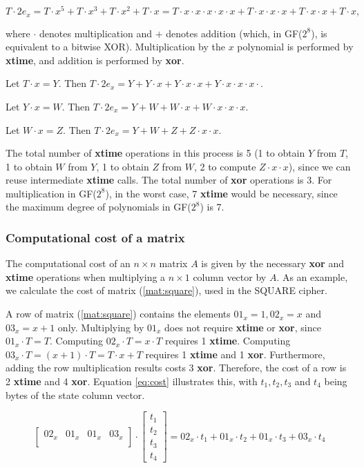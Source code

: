 \documentclass{report}
\begin{document}
$$
T \cdot 2e_x = T \cdot x^5 + T \cdot x^3 + T \cdot x^2 + T \cdot x = T \cdot x \cdot x \cdot x \cdot x \cdot x + T \cdot x \cdot x \cdot x + T \cdot x \cdot x + T \cdot x,
$$

where $\cdot$ denotes multiplication and $+$ denotes addition (which, in GF($2^8$), is equivalent to a bitwise XOR). Multiplication by the $x$ polynomial is performed by \textbf{xtime}, and addition is performed by \textbf{xor}.

Let $T \cdot x = Y$. Then $T \cdot 2e_x = Y + Y \cdot x + Y \cdot x \cdot x + Y \cdot x \cdot x \cdot x \cdot $.

Let $Y \cdot x = W$. Then $T \cdot 2e_x = Y + W + W \cdot x + W \cdot x \cdot x \cdot x$.

Let $W \cdot x = Z$. Then $T \cdot 2e_x = Y + W + Z + Z \cdot x \cdot x$.

The total number of \textbf{xtime} operations in this process is 5 (1 to obtain $Y$ from $T$, 1 to obtain $W$ from $Y$, 1 to obtain $Z$ from $W$, 2 to compute $Z \cdot x \cdot x$), since we can reuse intermediate \textbf{xtime} calls. The total number of \textbf{xor} operations is 3. For multiplication in GF($2^8$), in the worst case, 7 \textbf{xtime} would be necessary, since the maximum degree of polynomials in GF($2^8$) is 7.

\subsubsection{Computational cost of a matrix}
The computational cost of an $n\times n$ matrix $A$ is given by the necessary \textbf{xor} and \textbf{xtime} operations when multiplying a $n\times1$ column vector by $A$. As an example, we calculate the cost of matrix (\ref{mat:square}), used in the SQUARE \cite{SQUARE1997} cipher.

A row of matrix (\ref{mat:square}) contains the elements $01_x = 1, 02_x = x$ and $03_x = x + 1$ only. Multiplying by $01_x$ does not require \textbf{xtime} or \textbf{xor}, since $01_x \cdot T = T$. Computing $02_x \cdot T = x \cdot T$ requires 1 \textbf{xtime}. Computing $03_x \cdot T = (x + 1) \cdot T = T \cdot x + T$ requires 1 \textbf{xtime} and 1 \textbf{xor}. Furthermore, adding the row multiplication results costs 3 \textbf{xor}. Therefore, the cost of a row is 2 \textbf{xtime} and 4 \textbf{xor}. Equation \ref{eq:cost} illustrates this, with $t_1, t_2, t_3$ and $t_4$ being bytes of the state column vector.

\begin{equation}\label{eq:cost}
\begin{bmatrix}
02_x & 01_x & 01_x & 03_x\\
\end{bmatrix}
\cdot
\begin{bmatrix}
t_1\\
t_2\\
t_3\\
t_4
\end{bmatrix}
= 02_x \cdot t_1 + 01_x \cdot t_2 + 01_x \cdot t_3 + 03_x \cdot t_4
\end{equation}
\end{document}
